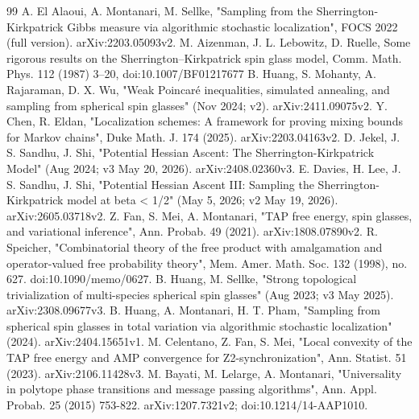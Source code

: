 \documentclass[11pt]{article}
\begin{document}
\space%

\begin{thebibliography}{99}
\small
{} A. El Alaoui, A. Montanari, M. Sellke, "Sampling from the Sherrington-Kirkpatrick Gibbs measure via algorithmic stochastic localization", FOCS 2022 (full version). arXiv:2203.05093v2.
 M. Aizenman, J. L. Lebowitz, D. Ruelle, Some rigorous results on the Sherrington--Kirkpatrick spin glass model, Comm. Math. Phys. 112 (1987) 3--20, doi:10.1007/BF01217677
 B. Huang, S. Mohanty, A. Rajaraman, D. X. Wu, "Weak Poincaré inequalities, simulated annealing, and sampling from spherical spin glasses" (Nov 2024; v2). arXiv:2411.09075v2.
 Y. Chen, R. Eldan, "Localization schemes: A framework for proving mixing bounds for Markov chains", Duke Math. J. 174 (2025). arXiv:2203.04163v2.
 D. Jekel, J. S. Sandhu, J. Shi, "Potential Hessian Ascent: The Sherrington-Kirkpatrick Model" (Aug 2024; v3 May 20, 2026). arXiv:2408.02360v3.
 E. Davies, H. Lee, J. S. Sandhu, J. Shi, "Potential Hessian Ascent III: Sampling the Sherrington-Kirkpatrick model at beta < 1/2" (May 5, 2026; v2 May 19, 2026). arXiv:2605.03718v2.
 Z. Fan, S. Mei, A. Montanari, "TAP free energy, spin glasses, and variational inference", Ann. Probab. 49 (2021). arXiv:1808.07890v2.
 R. Speicher, "Combinatorial theory of the free product with amalgamation and operator-valued free probability theory", Mem. Amer. Math. Soc. 132 (1998), no. 627. doi:10.1090/memo/0627.
 B. Huang, M. Sellke, "Strong topological trivialization of multi-species spherical spin glasses" (Aug 2023; v3 May 2025). arXiv:2308.09677v3.
 B. Huang, A. Montanari, H. T. Pham, "Sampling from spherical spin glasses in total variation via algorithmic stochastic localization" (2024). arXiv:2404.15651v1.
 M. Celentano, Z. Fan, S. Mei, "Local convexity of the TAP free energy and AMP convergence for Z2-synchronization", Ann. Statist. 51 (2023). arXiv:2106.11428v3.
 M. Bayati, M. Lelarge, A. Montanari, "Universality in polytope phase transitions and message passing algorithms", Ann. Appl. Probab. 25 (2015) 753-822. arXiv:1207.7321v2; doi:10.1214/14-AAP1010.

\end{thebibliography}
\end{document}
